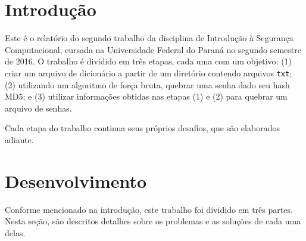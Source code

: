 \documentclass{sig-alternate-05-2015}
\begin{document}
%
\author{
%
%
\alignauthor
Renan Domingos Merlin Greca\\
			\\
\alignauthor
José Robyson Aggio Molinari\\
			\\
}
\date{5 September 2016}

\maketitle

\section{Introdução}
Este é o relatório do segundo trabalho da disciplina de Introdução à Segurança Computacional, cursada na Universidade Federal do Paraná no segundo semestre de 2016.
O trabalho é dividido em três etapas, cada uma com um objetivo:
(1) criar um arquivo de dicionário a partir de um diretório contendo arquivos \texttt{txt};
(2) utilizando um algoritmo de força bruta, quebrar uma senha dado seu hash MD5;
e (3) utilizar informações obtidas nas etapas (1) e (2) para quebrar um arquivo de senhas.

Cada etapa do trabalho continua seus próprios desafios, que são elaborados adiante.

\section{Desenvolvimento}
Conforme mencionado na introdução, este trabalho foi dividido em três partes.
Nesta seção, são descritos detalhes sobre os problemas e as soluções de cada uma delas.
\end{document}
